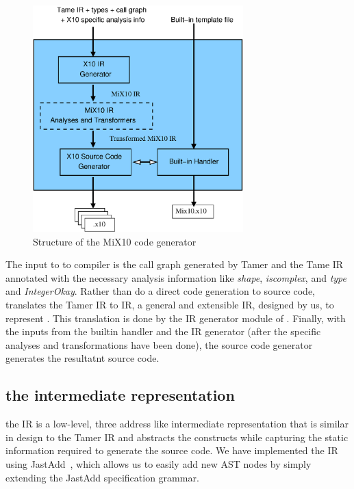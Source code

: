 \begin{figure}[htbp] 
\begin{center}
\includegraphics[width=3.2in]{Figures/x10.eps} 
\caption{Structure of the MiX10 code generator}\label{Fig:x10}
\end{center}
\end{figure}

 The input to to \mixten compiler is the call graph generated by Tamer and the
Tame IR annotated with the necessary analysis information like \emph{shape},
\emph{iscomplex}, and \emph{type} and \emph{IntegerOkay}.  Rather than do a
direct code generation to \xten source code, \mixten translates the Tamer IR to
\mixten IR, a general and extensible IR, designed by us, to represent \xten.
This translation is done by the \xten IR generator module of \mixten. Finally,
with the inputs from the builtin handler and the \xten IR generator (after the
\xten specific analyses and transformations have been done), the \xten source
code generator generates the resultatnt \xten source code.

\subsection{the \mixten intermediate representation}

the \mixten IR is a low-level, three address like intermediate representation
that is similar in design to the Tamer IR and abstracts the \xten constructs
while capturing the static information required to generate the \xten source
code.
We have implemented the IR using JastAdd~\cite{ekman04,jastaddurl}, which allows
us to easily add new AST nodes by simply extending the JastAdd
specification grammar.

